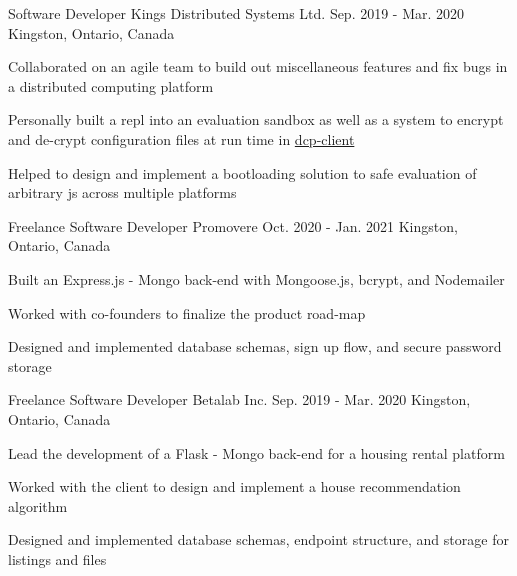 

\begin{cventries}

  \cventry
    {Software Developer} %
    {Kings Distributed Systems Ltd.} %
    {Sep. 2019 - Mar. 2020} %
    {Kingston, Ontario, Canada} %
    {
      \begin{cvitems} %
        \item{Collaborated on an agile team to build out miscellaneous features and fix bugs in a distributed computing platform}
        \item{Personally built a repl into an evaluation sandbox as well as a system to encrypt and de-crypt configuration files at run time in \href{https://www.npmjs.com/package/dcp-client}{dcp-client}}
        \item{Helped to design and implement a bootloading solution to safe evaluation of arbitrary js across multiple platforms}
      \end{cvitems}
    }

  \cventry
    {Freelance Software Developer} %
    {Promovere} %
    {Oct. 2020 - Jan. 2021} %
    {Kingston, Ontario, Canada} %
    {
      \begin{cvitems} %
        \item {Built an Express.js - Mongo back-end with Mongoose.js, bcrypt, and Nodemailer}
        \item{Worked with co-founders to finalize the product road-map}
        \item{Designed and implemented database schemas, sign up flow, and secure password storage}
      \end{cvitems}
    }

  \cventry
    {Freelance Software Developer} %
    {Betalab Inc.} %
    {Sep. 2019 - Mar. 2020} %
    {Kingston, Ontario, Canada} %
    {
      \begin{cvitems} %
        \item {Lead the development of a Flask - Mongo back-end for a housing rental platform} %
        \item{Worked with the client to design and implement a house recommendation algorithm}
        \item{Designed and implemented database schemas, endpoint structure, and storage for listings and files}
      \end{cvitems}
    }


\end{cventries}
